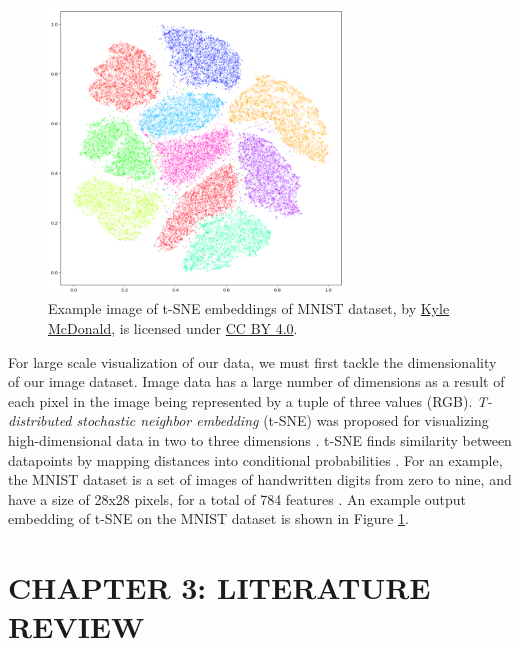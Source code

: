 \documentclass[12pt]{article}
\begin{document}
\begin{figure}[h]
    \centering
    \includegraphics[width=0.7\textwidth]{assets/images/tsne.png}
    \caption{Example image of t-SNE embeddings of MNIST dataset,
        by \href{https://www.flickr.com/photos/kylemcdonald/26620503329/}{Kyle
            McDonald}, is licensed under
        \href{https://creativecommons.org/licenses/by/4.0/}{CC BY 4.0}.}
    \label{fig:tsne}
\end{figure}

For large scale visualization of our data, we must first tackle the
dimensionality of our image dataset. Image data has a large number of dimensions
as a result of each pixel in the image being represented by a tuple of three
values (RGB). \textit{T-distributed stochastic neighbor embedding} (t-SNE) was
proposed for visualizing high-dimensional data in two to three dimensions
\cite{maaten_visualizing_2008}. t-SNE finds similarity between datapoints by
mapping distances into conditional probabilities \cite{maaten_visualizing_2008}.
For an example, the MNIST dataset is a set of images of handwritten digits from
zero to nine, and have a size of 28x28 pixels, for a total of 784 features
\cite{deng_mnist_2012}. An example output embedding of t-SNE on the
MNIST dataset is shown in Figure \ref{fig:tsne}.

\FloatBarrier
\newpage
\section{CHAPTER 3: LITERATURE REVIEW}
\end{document}
